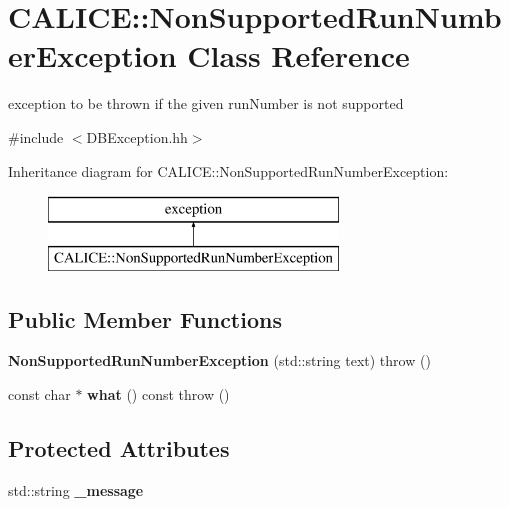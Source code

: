 \section{C\-A\-L\-I\-C\-E\-:\-:Non\-Supported\-Run\-Number\-Exception Class Reference}
\label{classCALICE_1_1NonSupportedRunNumberException}


exception to be thrown if the given run\-Number is not supported  




{\ttfamily \#include $<$D\-B\-Exception.\-hh$>$}

Inheritance diagram for C\-A\-L\-I\-C\-E\-:\-:Non\-Supported\-Run\-Number\-Exception\-:\begin{figure}[H]
\begin{center}
\leavevmode
\includegraphics[height=2.000000cm]{classCALICE_1_1NonSupportedRunNumberException}
\end{center}
\end{figure}
\subsection*{Public Member Functions}
\begin{DoxyCompactItemize}
\item 
{\bfseries Non\-Supported\-Run\-Number\-Exception} (std\-::string text)  throw ()\label{classCALICE_1_1NonSupportedRunNumberException_a8930360bfbe77fc806d31f4552b99433}

\item 
const char $\ast$ {\bfseries what} () const   throw ()\label{classCALICE_1_1NonSupportedRunNumberException_a696cc733eb1fd74d2a33ffa5140e9563}

\end{DoxyCompactItemize}
\subsection*{Protected Attributes}
\begin{DoxyCompactItemize}
\item 
std\-::string {\bfseries \-\_\-message}\label{classCALICE_1_1NonSupportedRunNumberException_ad2f56451dab096208bae9e3e3b653dce}

\end{DoxyCompactItemize}


